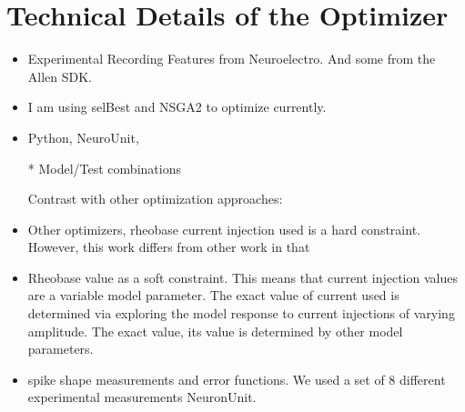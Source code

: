 \section{Technical Details of the Optimizer}
\begin{itemize}

\item Experimental Recording Features from Neuroelectro. And some from the Allen SDK.
\item I am using selBest and NSGA2 to optimize currently.
\item Python, NeuroUnit, 

* Model/Test combinations

Contrast with other optimization approaches:

\item Other optimizers, rheobase current injection used is a hard constraint. However, this work differs from other work in that 
\item Rheobase value as a soft constraint. This means that current injection values are a variable model parameter. The exact value of current used is determined via exploring the model response to current injections of varying amplitude. The exact value, its value is determined by other model parameters.

\item spike shape measurements and error functions. We used a set of 8 different experimental measurements NeuronUnit.
\end{itemize}
